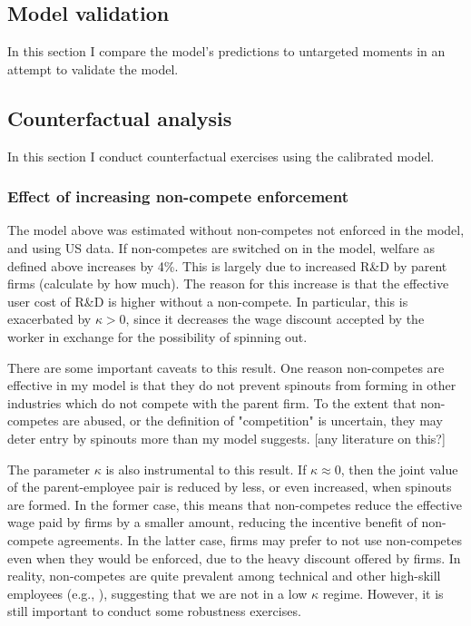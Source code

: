 \documentclass[12pt,english]{article}
\theoremstyle{remark}
\begin{document}
\subsection{Model validation}

In this section I compare the model's predictions to untargeted moments in an attempt to validate the model. 

\subsection{Counterfactual analysis}

In this section I conduct counterfactual exercises using the calibrated model. 

\subsubsection{Effect of increasing non-compete enforcement}

The model above was estimated without non-competes not enforced in the model, and using US data. If non-competes are switched on in the model, welfare as defined above increases by 4\%. This is largely due to increased R\&D by parent firms (calculate by how much). The reason for this increase is that the effective user cost of R\&D is higher without a non-compete. In particular, this is exacerbated by $\kappa > 0$, since it decreases the wage discount accepted by the worker in exchange for the possibility of spinning out. 

There are some important caveats to this result. One reason non-competes are effective in my model is that they do not prevent spinouts from forming in other industries which do not compete with the parent firm. To the extent that non-competes are abused, or the definition of "competition" is uncertain, they may deter entry by spinouts more than my model suggests. [any literature on this?]

The parameter $\kappa$ is also instrumental to this result. If $\kappa \approx 0$, then the joint value of the parent-employee pair is reduced by less, or even increased, when spinouts are formed. In the former case, this means that non-competes reduce the effective wage paid by firms by a smaller amount, reducing the incentive benefit of non-compete agreements. In the latter case, firms may prefer to not use non-competes even when they would be enforced, due to the heavy discount offered by firms. In reality, non-competes are quite prevalent among technical and other high-skill employees (e.g., \cite{starr_noncompetes_2019}), suggesting that we are not in a low $\kappa$ regime. However, it is still important to conduct some robustness exercises. 
\end{document}
